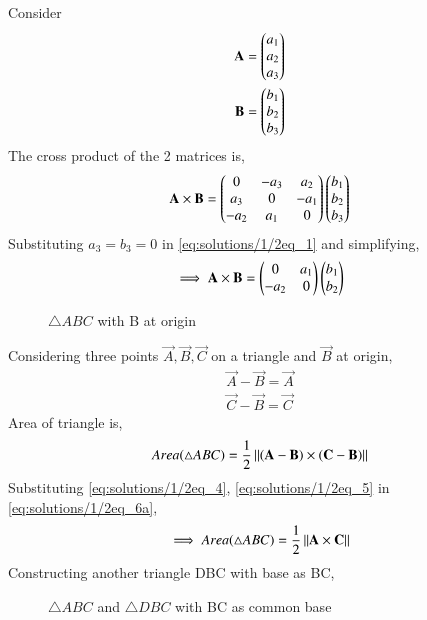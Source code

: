 Consider 
\begin{align}
    \mathbf{A} = \begin{pmatrix}a_1 \\ a_2 \\ a_3\end{pmatrix} 
\\
\mathbf{B} = \begin{pmatrix}b_1 \\ b_2 \\ b_3\end{pmatrix} 
\end{align}
The cross product of the 2 matrices is,
\begin{align} \label{eq:solutions/1/2eq_1}
    \mathbf{A} \times \mathbf{B} = \begin{pmatrix}0 & -a_3 & a_2 \\ a_3 & 0 & -a_1 \\ -a_2 & a_1 & 0\end{pmatrix} \begin{pmatrix}b_1 \\ b_2 \\ b_3\end{pmatrix} 
\end{align} 
Substituting $a_3 = b_3 = 0$ in \eqref{eq:solutions/1/2eq_1} and simplifying,
\begin{align}
    \implies \mathbf{A} \times \mathbf{B} = \begin{pmatrix}0 & a_1 \\ -a_2 & 0\end{pmatrix} \begin{pmatrix}b_1 \\ b_2\end{pmatrix}
\end{align}
\renewcommand{\thefigure}{1}
\begin{figure}[!ht] \label{fig:solutions/1/2triangle_abc}
\centering
\resizebox{\columnwidth}{!}{}
\caption{$\triangle ABC$ with B at origin}
\label{fig:solutions/1/2/one}
\end{figure} 
Considering three points $\vec{A},\vec{B},\vec{C}$ on a triangle and $\vec{B}$ at origin,
\begin{align}
    \vec{A} - \vec{B} = \vec{A} \label{eq:solutions/1/2eq_4}\\
    \vec{C} - \vec{B} = \vec{C} \label{eq:solutions/1/2eq_5}
\end{align}
Area of triangle is,
\begin{align} \label{eq:solutions/1/2eq_6a}
    Area(\triangle ABC) = \frac{1}{2}\left\lVert(\mathbf{A} - \mathbf{B}) \times (\mathbf{C} - \mathbf{B})\right\rVert
\end{align}
Substituting \eqref{eq:solutions/1/2eq_4}, \eqref{eq:solutions/1/2eq_5} in \eqref{eq:solutions/1/2eq_6a},
\begin{align} \label{eq:solutions/1/2eq_6b}
    \implies Area(\triangle ABC) = \frac{1}{2}\left\lVert\mathbf{A} \times \mathbf{C}\right\rVert
\end{align}
Constructing another triangle DBC with base as BC,
\renewcommand{\thefigure}{2}
\begin{figure}[!ht] \label{fig:triangle_abc}
\centering
\resizebox{\columnwidth}{!}{}
\caption{$\triangle ABC$ and $\triangle DBC$ with BC as common base}
\label{fig:solutions/1/2/two}
\end{figure} \\
